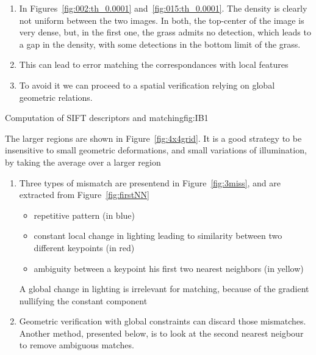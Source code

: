 \documentclass{article}
\begin{document}
\begin{enumerate}
	\item In Figures~\ref{fig:002:th_0.0001} and~\ref{fig:015:th_0.0001}. The density is clearly not uniform between the two images. In both, the top-center of the image is very dense, but, in the first one, the grass admits no detection, which leads to a gap in the density, with some detections in the bottom limit of the grass.
	\item This can lead to error matching the correspondances with local features
	\item To avoid it we can proceed to a spatial verification relying on global geometric relations.
\end{enumerate}



{}
{Computation of SIFT descriptors and matching}{fig:IB1}


The larger regions are shown in Figure~\ref{fig:4x4grid}. It is a good strategy to be insensitive to small geometric deformations, and small variations of illumination, by taking the average over a larger region



\begin{enumerate}
	\item Three types of mismatch are presentend in Figure~\ref{fig:3miss}, and are extracted from Figure~\ref{fig:firstNN} \begin{itemize}
		      \item repetitive pattern (in blue)
		      \item constant local change in lighting leading to similarity between two different keypoints (in red)
		      \item ambiguity between a keypoint his first two nearest neighbors (in yellow)
	      \end{itemize}
	      A global change in lighting is irrelevant for matching, because of the gradient nullifying the constant component
	\item Geometric verification with global constraints can discard those mismatches. Another method, presented below, is to look at the second nearest neigbour to remove ambiguous matches.
\end{enumerate}
\end{document}
